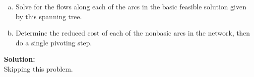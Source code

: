 \documentclass{article}
\begin{document}
\begin{enumerate}
\begin{figure}[h]
\begin{subfigure}
        \end{subfigure}
    \end{figure}

    \begin{enumerate}[(a)]
        \item Solve for the flows along each of the arcs in the basic feasible solution given by this spanning tree.

        \item Determine the reduced cost of each of the nonbasic arcs in the network, then do a single pivoting step.
        
    \end{enumerate}

    \textbf{Solution:} \\

    Skipping this problem.
    
\end{enumerate}
\end{document}
